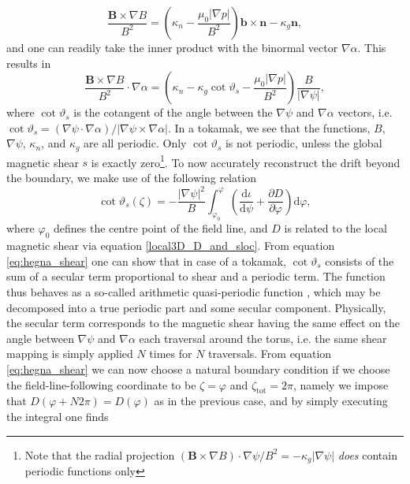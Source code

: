 \begin{equation}
    \frac{\mathbf{B} \times \nabla B}{B^2} = \left( \kappa_n -  \frac{\mu_0 |\nabla p|}{B^2}  \right)  \mathbf{b} \times \mathbf{n} - \kappa_g \mathbf{n},
\end{equation}
and one can readily take the inner product with the binormal vector $\nabla \alpha$. This results in
\begin{equation}
    \frac{\mathbf{B} \times \nabla B}{B^2} \cdot \nabla \alpha = \left( \kappa_n - \kappa_g \cot \vartheta_s - \frac{\mu_0 |\nabla p|}{B^2} \right) \frac{B}{|\nabla \psi|},
\end{equation}
where $\cot\vartheta_s$ is the cotangent of the angle between the $\nabla \psi$ and $\nabla \alpha$ vectors, i.e. $\cot\vartheta_s = (\nabla \psi \cdot \nabla \alpha)/| \nabla \psi \times \nabla \alpha |$. In a tokamak, we see that the functions, $B$, $\nabla \psi$, $\kappa_n$, and $\kappa_g$ are all periodic. Only $\cot\vartheta_s$ is not periodic, unless the global magnetic shear $s$ is exactly zero\footnote{Note that the radial projection $(\mathbf{B} \times \nabla B) \cdot \nabla \psi/B^2  = -\kappa_g |\nabla \psi|$ \emph{does} contain periodic functions only}. To now accurately reconstruct the drift beyond the boundary, we make use of the following relation \cite{hegna2000local}
\begin{equation}
    \cot \vartheta_s(\zeta) =-\frac{|\nabla \psi|^2}{B} \int_{\varphi_0}^{\varphi} \left( \frac{\mathrm{d} \iota}{\mathrm{d} \psi} + \frac{\partial D}{\partial \varphi} \right) \mathrm{d} \varphi,
    \label{eq:hegna_shear}
\end{equation}
where $\varphi_0$ defines the centre point of the field line, and $D$ is related to the local magnetic shear via equation \eqref{local3D_D_and_sloc}. From equation \eqref{eq:hegna_shear} one can show that in case of a tokamak, $\cot \vartheta_s$ consists of the sum of a secular term proportional to shear and a periodic term. The function thus behaves as a so-called arithmetic quasi-periodic function \cite{corduneanu2009almost,oka2022space}, which may be decomposed into a true periodic part and some secular component. Physically, the secular term corresponds to the magnetic shear having the same effect on the angle between $\nabla \psi$ and $\nabla \alpha$ each traversal around the torus, i.e. the same shear mapping is simply applied $N$ times for $N$ traversals. From equation \eqref{eq:hegna_shear} we can now choose a natural boundary condition if we choose the field-line-following coordinate to be $\zeta=\varphi$ and $\zeta_\mathrm{tot}=2\pi$, namely we impose that $D(\varphi+N 2 \pi)=D(\varphi)$ as in the previous case, and by simply executing the integral one finds
